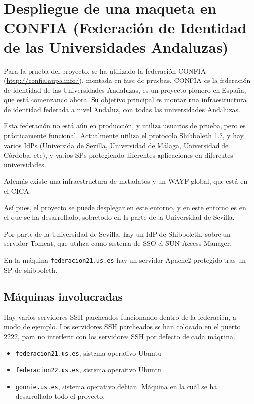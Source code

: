 \chapter{Despliegue de una maqueta en CONFIA (Federación de Identidad de las Universidades Andaluzas)}

    Para la prueba del proyecto, se ha utilizado la federación CONFIA
    (\url{http://confia.aupa.info/}),
    montada en fase de pruebas. CONFIA es la federación de identidad de las
    Universidades Andaluzas, es un proyecto pionero en España, que está
    comenzando ahora. Su objetivo principal es montar una infraestructura
    de identidad federada a nivel Andaluz, con todas las universidades
    Andaluzas.

    Esta federación no está aún en producción, y utiliza usuarios de
    prueba, pero es prácticamente funcional. Actualmente utiliza el
    protocolo Shibboleth 1.3, y hay varios IdPs (Universida de Sevilla,
    Universidad de Málaga, Universidad de Córdoba, etc), y varios SPs
    protegiendo diferentes aplicaciones en diferentes universidades.

    Además existe una infraestructura de metadatos y un WAYF global, que está
    en el CICA.

    Así pues, el proyecto se puede desplegar en este entorno, y en este
    entorno es en el que se ha desarrollado, sobretodo en la parte de la
    Universidad de Sevilla.

    Por parte de la Universidad de Sevilla, hay un IdP de Shibboleth, sobre
    un servidor Tomcat, que utiliza como sistema de SSO el SUN Access
    Manager.


    En la máquina \texttt{federacion21.us.es} hay un servidor Apache2
    protegido tras un SP de shibboleth.

    \section{Máquinas involucradas}

    Hay varios servidores SSH parcheados funcionando dentro de la
    federación, a modo de ejemplo. Los servidores SSH parcheados se han
    colocado en el puerto 2222, para no interferir con los servidores SSH
    por defecto de cada máquina.

    \begin{itemize}

    \item \texttt{federacion21.us.es}, sistema operativo Ubuntu
    \item \texttt{federacion22.us.es}, sistema operativo Ubuntu
    \item \texttt{goonie.us.es}, sistema operativo debian. Máquina en la
    cuál se ha desarrollado todo el proyecto.

    \end{itemize}

